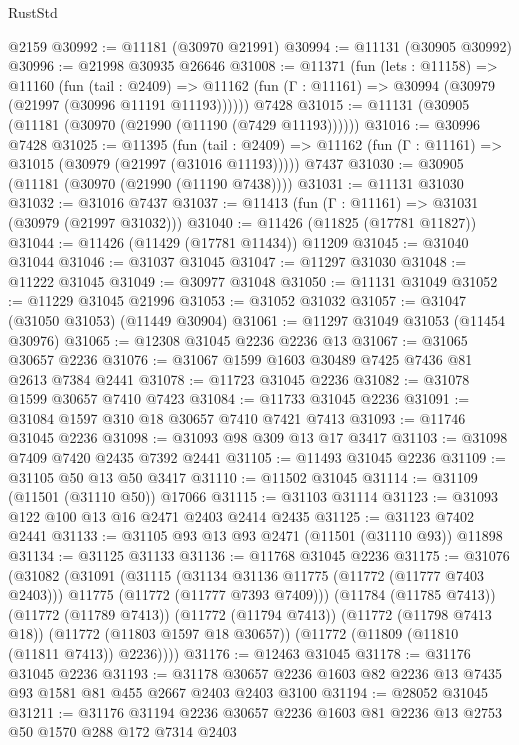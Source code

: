 \begin{lexlean}{RustStd}
\begin{coremodule}
    @2159
@30992 := @11181 (@30970 @21991)
@30994 := @11131 (@30905 @30992)
@30996 := @21998 @30935 @26646
@31008 := @11371
    (fun (lets : @11158) =>
    @11160
      (fun (tail : @2409) =>
      @11162 (fun (Γ : @11161) => @30994 (@30979 (@21997 (@30996 @11191 @11193))))))
    @7428
@31015 := @11131 (@30905 (@11181 (@30970 (@21990 (@11190 (@7429 @11193))))))
@31016 := @30996 @7428
@31025 := @11395
    (fun (tail : @2409) => @11162 (fun (Γ : @11161) => @31015 (@30979 (@21997 (@31016 @11193)))))
    @7437
@31030 := @30905 (@11181 (@30970 (@21990 (@11190 @7438))))
@31031 := @11131 @31030
@31032 := @31016 @7437
@31037 := @11413 (fun (Γ : @11161) => @31031 (@30979 (@21997 @31032)))
@31040 := @11426 (@11825 (@17781 @11827))
@31044 := @11426 (@11429 (@17781 @11434)) @11209
@31045 := @31040 @31044
@31046 := @31037 @31045
@31047 := @11297 @31030
@31048 := @11222 @31045
@31049 := @30977 @31048
@31050 := @11131 @31049
@31052 := @11229 @31045 @21996
@31053 := @31052 @31032
@31057 := @31047 (@31050 @31053) (@11449 @30904)
@31061 := @11297 @31049 @31053 (@11454 @30976)
@31065 := @12308 @31045 @2236 @2236 @13
@31067 := @31065 @30657 @2236
@31076 := @31067 @1599 @1603 @30489 @7425 @7436 @81 @2613 @7384 @2441
@31078 := @11723 @31045 @2236
@31082 := @31078 @1599 @30657 @7410 @7423
@31084 := @11733 @31045 @2236
@31091 := @31084 @1597 @310 @18 @30657 @7410 @7421 @7413
@31093 := @11746 @31045 @2236
@31098 := @31093 @98 @309 @13 @17 @3417
@31103 := @31098 @7409 @7420 @2435 @7392 @2441
@31105 := @11493 @31045 @2236
@31109 := @31105 @50 @13 @50 @3417
@31110 := @11502 @31045
@31114 := @31109 (@11501 (@31110 @50)) @17066
@31115 := @31103 @31114
@31123 := @31093 @122 @100 @13 @16 @2471 @2403 @2414 @2435
@31125 := @31123 @7402 @2441
@31133 := @31105 @93 @13 @93 @2471 (@11501 (@31110 @93)) @11898
@31134 := @31125 @31133
@31136 := @11768 @31045 @2236
@31175 := @31076
    (@31082
      (@31091
        (@31115
          (@31134 @31136 @11775 (@11772 (@11777 @7403 @2403)))
          @11775
          (@11772 (@11777 @7393 @7409)))
        (@11784 (@11785 @7413))
        (@11772 (@11789 @7413))
        (@11772 (@11794 @7413))
        (@11772 (@11798 @7413 @18))
        (@11772 (@11803 @1597 @18 @30657))
        (@11772 (@11809 (@11810 (@11811 @7413)) @2236))))
@31176 := @12463 @31045
@31178 := @31176 @31045 @2236
@31193 := @31178 @30657 @2236 @1603 @82 @2236 @13 @7435 @93 @1581 @81 @455 @2667 @2403 @2403 @3100
@31194 := @28052 @31045
@31211 := @31176
    @31194
    @2236
    @30657
    @2236
    @1603
    @81
    @2236
    @13
    @2753
    @50
    @1570
    @288
    @172
    @7314
    @2403

\end{coremodule}
\end{lexlean}

